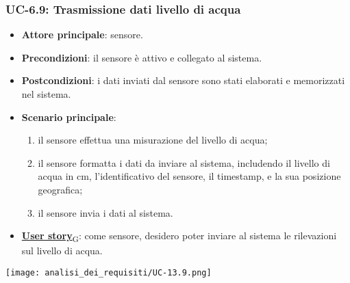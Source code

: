 \subsubsection{UC-6.9: Trasmissione dati livello di acqua}
\begin{itemize}
	\item \textbf{Attore principale}: sensore.
	\item \textbf{Precondizioni}: il sensore è attivo e collegato al sistema.
	\item \textbf{Postcondizioni}: i dati inviati dal sensore sono stati elaborati e memorizzati nel sistema.
	\item \textbf{Scenario principale}:
	      \begin{enumerate}
		      \item il sensore effettua una misurazione del livello di acqua;
		      \item il sensore formatta i dati da inviare al sistema, includendo il livello di acqua in cm, l'identificativo del sensore,
		            il timestamp, e la sua posizione geografica;
		      \item il sensore invia i dati al sistema.
	      \end{enumerate}
	\item \href{https://7last.github.io/docs/pb/documentazione-interna/glossario\#user-story}{\textbf{User story}\textsubscript{G}}: come sensore, desidero poter inviare al sistema le rilevazioni sul livello di acqua.
\end{itemize}

\begin{center}
	\texttt{[image: analisi\_dei\_requisiti/UC-13.9.png]}
\end{center}

